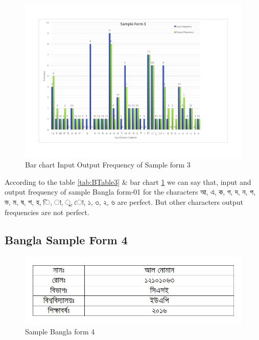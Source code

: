 \begin{figure}[H]
\centering
\includegraphics[width=1\textwidth]{Bform3.pdf}
\caption {Bar chart Input Output Frequency of Sample form 3}
\label {fig:Bbar3}
\end{figure}

According to the table \ref{tab:BTable3} \& bar chart \ref{fig:Bbar3} we can say that, input and output frequency of sample Bangla form-01 for the characters {\bengalifont আ,  এ, ক, গ, দ, ন, প, ভ, ম, ষ, শ, হ, ি, া, ু, ো, ১, ৩, ২, ৬  }are perfect. But other characters output frequencies are not perfect.

\subsection{Bangla Sample Form 4}
\begin{figure}[H]
\centering
\includegraphics[width=1\textwidth]{formBen04.JPG}
\caption {Sample Bangla form 4}
\label {fig:FormBan4}
\end{figure}


